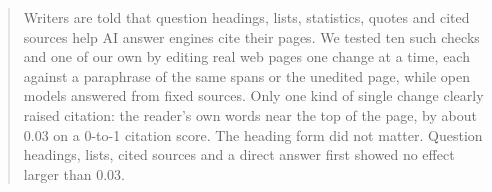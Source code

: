 \begin{abstract}
Writers are told that question headings, lists, statistics, quotes and cited sources help AI answer engines cite their pages.
We tested ten such checks and one of our own by editing real web pages one change at a time, each against a paraphrase of the same spans or the unedited page, while open models answered from fixed sources.
Only one kind of single change clearly raised citation: the reader's own words near the top of the page, by about 0.03 on a 0-to-1 citation score.
The heading form did not matter.
Question headings, lists, cited sources and a direct answer first showed no effect larger than 0.03.

\end{abstract}
